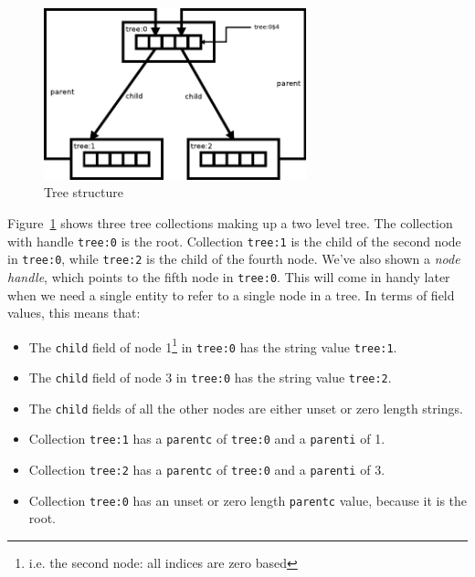 \begin{figure}[htp]
\centering
\includegraphics[width=3in]{tree.pdf}
\caption{Tree structure}
\label{fig1}
\end{figure}
Figure~\ref{fig1} shows three tree collections making up a two level tree. The
collection with handle \texttt{tree:0} is the root. Collection \texttt{tree:1}
is the child of the second node in \texttt{tree:0}, while \texttt{tree:2} is
the child of the fourth node. We've also shown a \emph{node handle}, which
points to the fifth node in \texttt{tree:0}. This will come in handy later
when we need a single entity to refer to a single node in a tree. \clearpage
\noindent In terms of field values, this means that:
\begin{itemize}
\item The \texttt{child} field of node 1\footnote{i.e. the second node: all indices are zero based} in \texttt{tree:0}
has the string value \texttt{tree:1}.
\item The \texttt{child} field of node 3 in \texttt{tree:0} has the string value \texttt{tree:2}.
\item The \texttt{child} fields of all the other nodes are either unset or zero length strings.
\item Collection \texttt{tree:1} has a \texttt{parentc} of \texttt{tree:0} and a \texttt{parenti} of 1.
\item Collection \texttt{tree:2} has a \texttt{parentc} of \texttt{tree:0} and a \texttt{parenti} of 3.
\item Collection \texttt{tree:0} has an unset or zero length \texttt{parentc} value, because it is the root.
\end{itemize}

